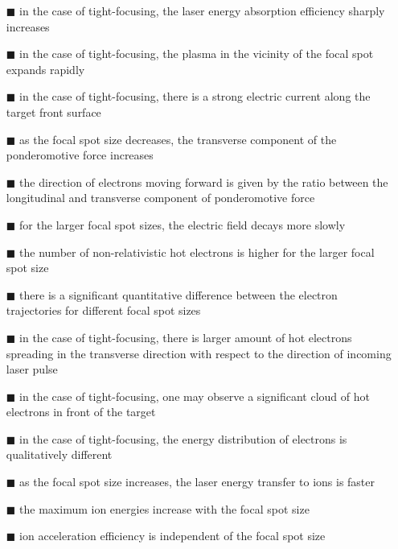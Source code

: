 \begin{itemize}
	\item[\tiny $\blacksquare$] in the case of tight-focusing, the laser energy absorption efficiency sharply increases
	\item[\tiny $\blacksquare$] in the case of tight-focusing, the plasma in the vicinity of the focal spot expands rapidly
	\item[\tiny $\blacksquare$] in the case of tight-focusing, there is a strong electric current along the target front surface
	\item[\tiny $\blacksquare$] as the focal spot size decreases, the transverse component of the ponderomotive force increases
	\item[\tiny $\blacksquare$] the direction of electrons moving forward is given by the ratio between the longitudinal and transverse component of ponderomotive force
	\item[\tiny $\blacksquare$] for the larger focal spot sizes, the electric field decays more slowly
	\item[\tiny $\blacksquare$] the number of non-relativistic hot electrons is higher for the larger focal spot size 
	\item[\tiny $\blacksquare$] there is a significant quantitative difference between the electron trajectories for different focal spot sizes
	\item[\tiny $\blacksquare$] in the case of tight-focusing, there is larger amount of hot electrons spreading in the transverse direction with respect to the direction of incoming laser pulse
	\item[\tiny $\blacksquare$] in the case of tight-focusing, one may observe a significant cloud of hot electrons in front of the target
	\item[\tiny $\blacksquare$] in the case of tight-focusing, the energy distribution of electrons is qualitatively different
	\item[\tiny $\blacksquare$] as the focal spot size increases, the laser energy transfer to ions is faster
	\item[\tiny $\blacksquare$] the maximum ion energies increase with the focal spot size
	\item[\tiny $\blacksquare$] ion acceleration efficiency is independent of the focal spot size
\end{itemize}

